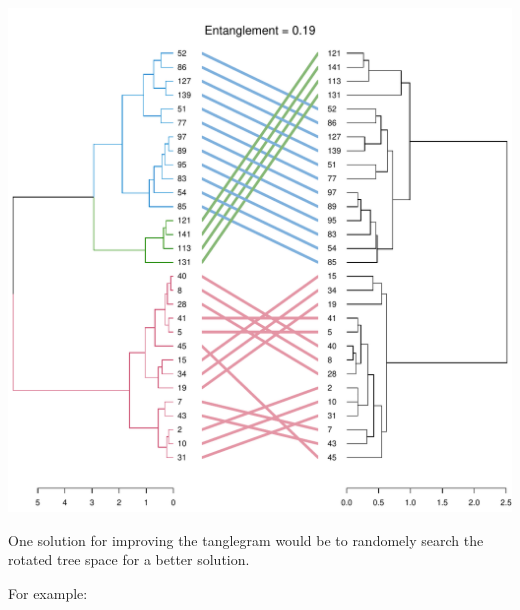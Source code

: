 \documentclass[shortnames,nojss,article]{jss}\usepackage[]{graphicx}\usepackage[]{color}
\makeatletter
\def\maxwidth{ %
  \ifdim\Gin@nat@width>\linewidth
    \linewidth
  \else
    \Gin@nat@width
  \fi
}
\newenvironment{knitrout}{}{} %
\makeatother
\begin{document}
\begin{knitrout}
{\centering \includegraphics[width=\maxwidth]{figure/unnamed-chunk-34} 

}



\end{knitrout}


One solution for improving the tanglegram would be to randomely search the rotated tree space for a better solution.

For example:
\end{document}
